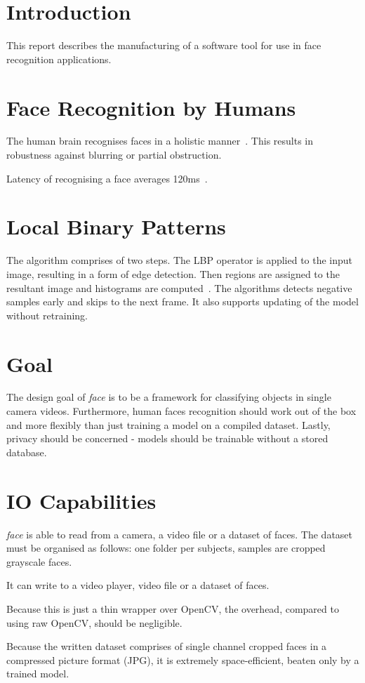 \documentclass{article}
\title{}
\author{Miroslav Vitkov}
\date{\today}
\newcommand{\face}[0]{\textit{face }}
\newcommand{\para}[0]{\\ \par \noindent}
\begin{document}
\maketitle


\section{Introduction}
This report describes the manufacturing of a software tool for use in face recognition applications.


\section{Face Recognition by Humans}
The human brain recognises faces in a holistic manner~\cite{sinha}.
This results in robustness against blurring or partial obstruction.
\para
Latency of recognising a face averages 120ms~\cite{sinha}.


\section{Local Binary Patterns}
The algorithm comprises of two steps.
The LBP operator is applied to the input image, resulting in a form of edge detection. 
Then regions are assigned to the resultant image and histograms are computed~\cite{ahonen}.
The algorithms detects negative samples early and skips to the next frame.
It also supports updating of the model without retraining.


\section{Goal}
The design goal of \face is to be a framework for classifying objects in single camera videos.
Furthermore, human faces recognition should work out of the box and more flexibly than just training a model on a compiled dataset.
Lastly, privacy should be concerned - models should be trainable without a stored database.

\section{IO Capabilities}
\face is able to read from a camera, a video file or a dataset of faces.
The dataset must be organised as follows: one folder per subjects, samples are cropped grayscale faces.
\para
It can write to a video player, video file or a dataset of faces.
\para
Because this is just a thin wrapper over OpenCV, the overhead, compared to using raw OpenCV, should be negligible.
\para
Because the written dataset comprises of single channel cropped faces in a compressed picture format (JPG), it is extremely space-efficient, 
beaten only by a trained model.
\end{document}
